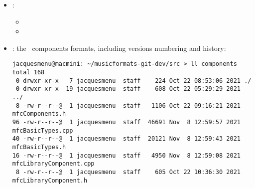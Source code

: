 \begin{itemize}
\begin{itemize}
  \item {}
  \item {}
  \item {}
  \item {}\\[-0.5ex]
  \end{itemize}

\item {} :

\begin{itemize}
  \item {}
  \item {}
  \end{itemize}

\item {} : the \mf\ components formats, including versions numbering and history:
\begin{lstlisting}[language=Terminal]
jacquesmenu@macmini: ~/musicformats-git-dev/src > ll components
total 168
 0 drwxr-xr-x   7 jacquesmenu  staff    224 Oct 22 08:53:06 2021 ./
 0 drwxr-xr-x  19 jacquesmenu  staff    608 Oct 22 05:29:29 2021 ../
 8 -rw-r--r--@  1 jacquesmenu  staff   1106 Oct 22 09:16:21 2021 mfcComponents.h
96 -rw-r--r--@  1 jacquesmenu  staff  46691 Nov  8 12:59:57 2021 mfcBasicTypes.cpp
40 -rw-r--r--@  1 jacquesmenu  staff  20121 Nov  8 12:59:43 2021 mfcBasicTypes.h
16 -rw-r--r--@  1 jacquesmenu  staff   4950 Nov  8 12:59:08 2021 mfcLibraryComponent.cpp
 8 -rw-r--r--@  1 jacquesmenu  staff    605 Oct 22 10:36:30 2021 mfcLibraryComponent.h
\end{lstlisting}


\end{itemize}
